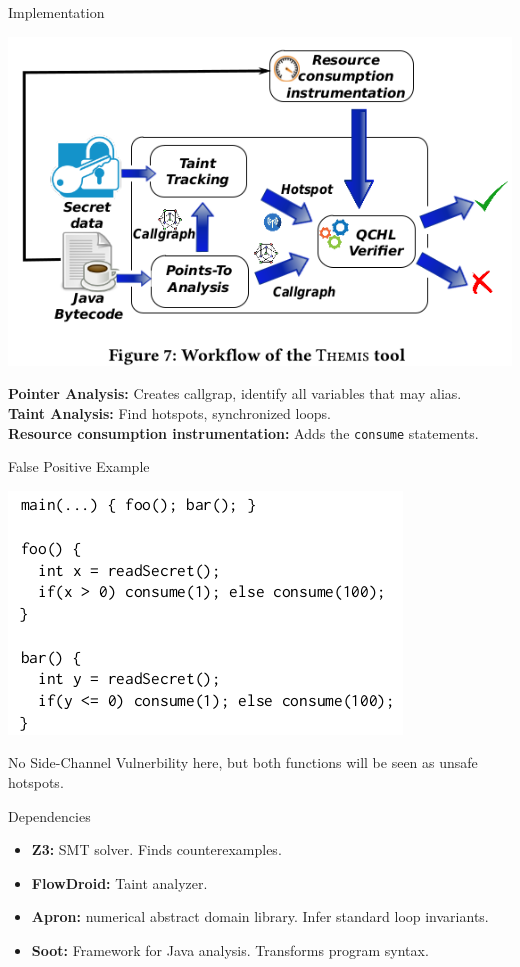 \documentclass[page number]{beamer}
\begin{document}
\begin{frame}{Implementation}
  \begin{center}
    \includegraphics[scale=0.35]{img_chen/7.png}
  \end{center}
  \textbf{Pointer Analysis:} Creates callgrap, identify all variables that may alias.\\
  \textbf{Taint Analysis:} Find hotspots, synchronized loops.\\
  \textbf{Resource consumption instrumentation:} Adds the \texttt{consume} statements.
\end{frame}

\begin{frame}{False Positive Example}
  \begin{center}
    \includegraphics[scale=0.4]{img_chen/foobar.png}
  \end{center}
  \vfill
  No Side-Channel Vulnerbility here, but both functions will be seen as unsafe hotspots.
\end{frame}

\begin{frame}{Dependencies}
  \begin{itemize}
  \item \textbf{Z3:} SMT solver. Finds counterexamples.
  \item \textbf{FlowDroid:} Taint analyzer.
  \item \textbf{Apron:} numerical abstract domain library. Infer standard loop invariants.
  \item \textbf{Soot:} Framework for Java analysis. Transforms program syntax.
  \end{itemize}
\end{frame}
\end{document}
